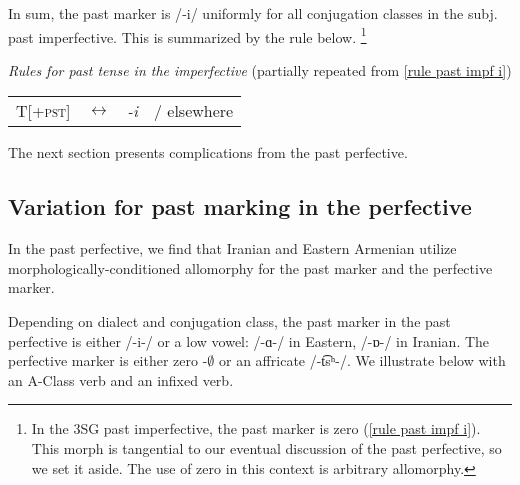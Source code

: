 In sum, the past marker is /{-i}/ uniformly for all conjugation classes in the subj. past imperfective. This is summarized by the  rule below. \footnote{In the 3SG past imperfective, the past marker is zero (\ref{rule past impf i}). This morph is tangential to our eventual discussion of the past perfective, so we set it aside. The use of zero in this context is arbitrary allomorphy.}

\begin{exe}
	\ex \textit{ Rules for past tense in the imperfective} (partially repeated from  \ref{rule past impf i})
	
	\begin{tabular}{llll}
		\textsc{T[+pst]} & $\leftrightarrow$ &  \textit{{-i}} &/ elsewhere
		
		
	\end{tabular}
\end{exe}


The next section presents complications from the past perfective.  



\subsection{Variation for past marking in the perfective}\label{section:verb:past: pfv basic}

In the past perfective, we find that Iranian and Eastern Armenian utilize morphologically-conditioned allomorphy for the past marker and the perfective marker. 

Depending on dialect and conjugation class, the past marker in  the past perfective is either /{-i-}/ or a low vowel: /{-ɑ-}/ in Eastern, /{-ɒ-}/ in Iranian. The perfective marker is either zero -$\emptyset$ or an affricate /{-\t{ts}ʰ-}/. We illustrate below with an A-Class verb and an infixed verb. 

